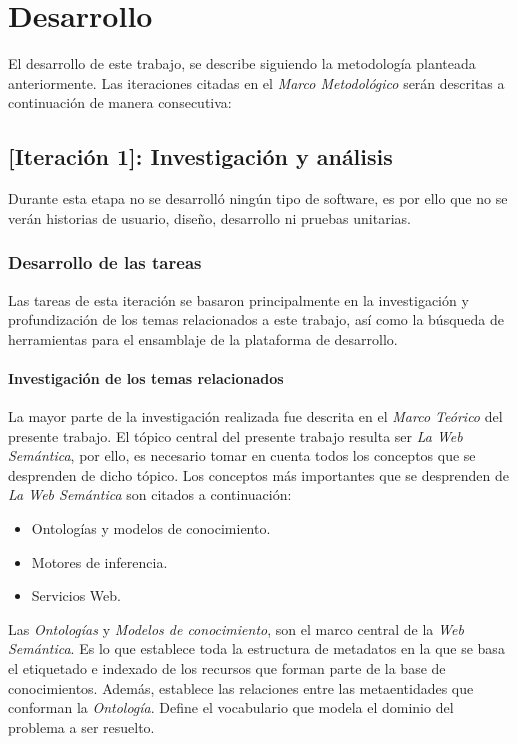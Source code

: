 \chapter{Desarrollo}
\label{chap:desarrollo}

El desarrollo de este trabajo, se describe siguiendo la metodología planteada anteriormente. Las iteraciones citadas en el \textit{Marco Metodológico} serán descritas a continuación de manera consecutiva:

\section{[Iteración 1]: Investigación y análisis}
Durante esta etapa no se desarrolló ningún tipo de software, es por ello que no se verán historias de usuario, diseño, desarrollo ni pruebas unitarias.

\subsection{Desarrollo de las tareas}
Las tareas de esta iteración se basaron principalmente en la investigación y profundización de los temas relacionados a este trabajo, así como la búsqueda de herramientas para el ensamblaje de la plataforma de desarrollo.

\subsubsection{Investigación de los temas relacionados}
La mayor parte de la investigación realizada fue descrita en el \textit{Marco Teórico} del presente trabajo. El tópico central del presente trabajo resulta ser \textit{La Web Semántica}, por ello, es necesario tomar en cuenta todos los conceptos que se desprenden de dicho tópico. Los conceptos más importantes que se desprenden de \textit{La Web Semántica} son citados a continuación:

\begin{itemize}
\item Ontologías y modelos de conocimiento.
\item Motores de inferencia.
\item Servicios Web.
\end{itemize}

Las \textit{Ontologías} y \textit{Modelos de conocimiento}, son el marco central de la \textit{Web Semántica}. Es lo que establece toda la estructura de metadatos en la que se basa el etiquetado e indexado de los recursos que forman parte de la base de conocimientos. Además, establece las relaciones entre las metaentidades que conforman la \textit{Ontología}. Define el vocabulario que modela el dominio del problema a ser resuelto.

